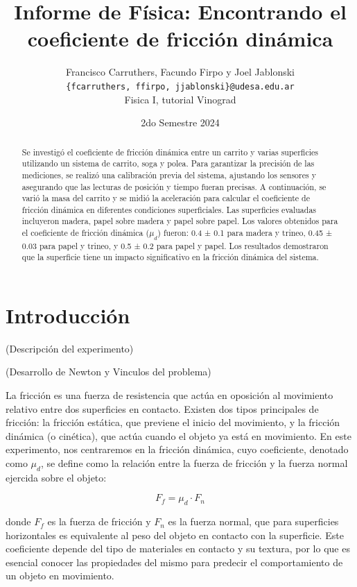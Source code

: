 \documentclass[12pt,a4]{article}
\title{Informe de Física: Encontrando el coeficiente de fricción dinámica}
\author{Francisco Carruthers, Facundo Firpo y Joel Jablonski\\ [2mm]
\small \texttt{\{fcarruthers, ffirpo, jjablonski\}@udesa.edu.ar}\\
\small Fisica I, tutorial Vinograd}
\date{2do Semestre 2024}
\begin{document}
\maketitle

\begin{abstract}
    Se investigó el coeficiente de fricción dinámica entre un carrito y varias superficies utilizando un sistema de carrito, soga y polea. Para garantizar la precisión de las mediciones, se realizó una calibración previa del sistema, ajustando los sensores y asegurando que las lecturas de posición y tiempo fueran precisas. A continuación, se varió la masa del carrito y se midió la aceleración para calcular el coeficiente de fricción dinámica en diferentes condiciones superficiales. Las superficies evaluadas incluyeron madera, papel sobre madera y papel sobre papel. Los valores obtenidos para el coeficiente de fricción dinámica ($\mu_d$) fueron: 0.4 ± 0.1 para madera y trineo, 0.45 ± 0.03 para papel y trineo, y 0.5 ± 0.2 para papel y papel. Los resultados demostraron que la superficie tiene un impacto significativo en la fricción dinámica del sistema.
\end{abstract}

\section{Introducción}

(Descripción del experimento)

(Desarrollo de Newton y Vinculos del problema)

La fricción es una fuerza de resistencia que actúa en oposición al movimiento relativo entre dos superficies en contacto. Existen dos tipos principales de fricción: la fricción estática, que previene el inicio del movimiento, y la fricción dinámica (o cinética), que actúa cuando el objeto ya está en movimiento. En este experimento, nos centraremos en la fricción dinámica, cuyo coeficiente, denotado como \(\mu_d\), se define como la relación entre la fuerza de fricción y la fuerza normal ejercida sobre el objeto:

\[
F_f = \mu_d \cdot F_n
\]

donde \(F_f\) es la fuerza de fricción y \(F_n\) es la fuerza normal, que para superficies horizontales es equivalente al peso del objeto en contacto con la superficie. Este coeficiente depende del tipo de materiales en contacto y su textura, por lo que es esencial conocer las propiedades del mismo para predecir el comportamiento de un objeto en movimiento.
\end{document}
